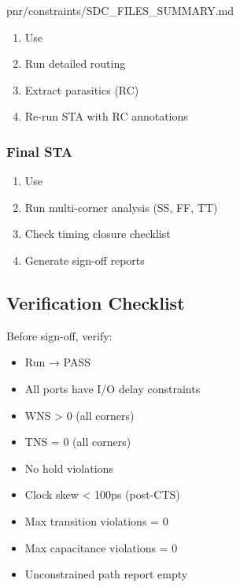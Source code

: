 \begin{relocated}{pnr/constraints/SDC_FILES_SUMMARY.md}
\begin{enumerate}
\def\labelenumi{\arabic{enumi}.}
\tightlist
\item
  Use 
\item
  Run detailed routing
\item
  Extract parasitics (RC)
\item
  Re-run STA with RC annotations
\end{enumerate}

\subsubsection{Final STA}\label{tm:pd:constraints-sdc-files-summary:final-sta}

\begin{enumerate}
\def\labelenumi{\arabic{enumi}.}
\tightlist
\item
  Use 
\item
  Run multi-corner analysis (SS, FF, TT)
\item
  Check timing closure checklist
\item
  Generate sign-off reports
\end{enumerate}

\subsection{Verification Checklist}\label{tm:pd:constraints-sdc-files-summary:verification-checklist}

Before sign-off, verify:

\begin{itemize}
\tightlist
\item[$\square$]
  Run  → PASS
\item[$\square$]
  All ports have I/O delay constraints
\item[$\square$]
  WNS \textgreater{} 0 (all corners)
\item[$\square$]
  TNS = 0 (all corners)
\item[$\square$]
  No hold violations
\item[$\square$]
  Clock skew \textless{} 100ps (post-CTS)
\item[$\square$]
  Max transition violations = 0
\item[$\square$]
  Max capacitance violations = 0
\item[$\square$]
  Unconstrained path report empty
\end{itemize}


\end{relocated}

